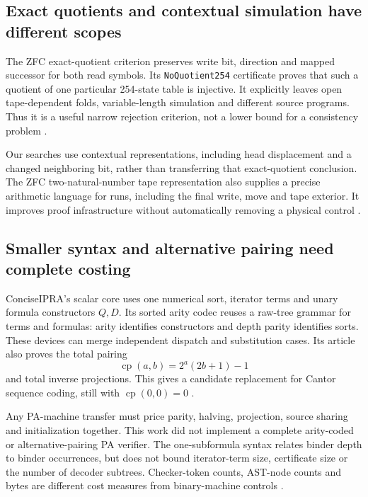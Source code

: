 \subsection{Exact quotients and contextual simulation have different scopes}

The ZFC exact-quotient criterion preserves write bit, direction and mapped
successor for both read symbols. Its \texttt{NoQuotient254} certificate
proves that such a quotient of one particular 254-state table is injective.
It explicitly leaves open tape-dependent folds, variable-length simulation
and different source programs. Thus it is a useful narrow rejection
criterion, not a lower bound for a consistency problem \cite{z-quotient}.

Our searches use contextual representations, including head displacement
and a changed neighboring bit, rather than transferring that exact-quotient
conclusion. The ZFC two-natural-number tape representation also supplies
a precise arithmetic language for runs, including the final write, move
and tape exterior. It improves proof infrastructure without automatically
removing a physical control \cite{z-arithmetic}.

\subsection{Smaller syntax and alternative pairing need complete costing}

ConciseIPRA's scalar core uses one numerical sort, iterator terms and
unary formula constructors $Q,D$. Its sorted arity codec reuses a raw-tree
grammar for terms and formulas: arity identifies constructors and depth
parity identifies sorts. These devices can merge independent dispatch
and substitution cases. Its article also proves the total pairing
\[
                \operatorname{cp}(a,b)=2^a(2b+1)-1
\]
and total inverse projections. This gives a candidate replacement for
Cantor sequence coding, still with $\operatorname{cp}(0,0)=0$
\cite{concise,c-base,c-codec}.

Any PA-machine transfer must price parity, halving, projection, source
sharing and initialization together. This work did not implement a
complete arity-coded or alternative-pairing PA verifier. The one-subformula
syntax relates binder depth to binder occurrences, but does not bound
iterator-term size, certificate size or the number of decoder subtrees.
Checker-token counts, AST-node counts and bytes are different cost
measures from binary-machine controls \cite{c-depth,c-codec}.


